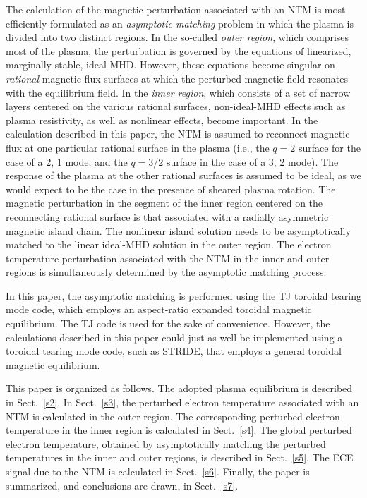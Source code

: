 \documentclass[12pt,prb,aps]{revtex4-1}
\begin{document}
The calculation of the  magnetic perturbation associated with an NTM is most efficiently formulated as an {\em asymptotic matching}\/ problem in which the  plasma is  divided into two distinct regions.\cite{tear1,tear2,tear3,tear4,tear5,tear6,tear7,tear8,tear9,tear10}    In the so-called {\em outer region}, which comprises most
of the plasma, the perturbation is governed by the equations of linearized, marginally-stable, ideal-MHD.
However, these equations become singular on   {\em rational}\/ magnetic flux-surfaces at which the perturbed magnetic field resonates with the equilibrium field. In the {\em inner region}, which
consists of a set of narrow layers centered on the various rational surfaces, non-ideal-MHD effects such as plasma resistivity, as well as nonlinear effects,  become important. 
 In the calculation described in this paper, the NTM is assumed to reconnect magnetic flux at one particular rational surface in the plasma (i.e., the
 $q=2$ surface for the case of a 2, 1 mode, and the $q=3/2$ surface in the case of a 3, 2 mode). The response of the plasma at the
 other rational surfaces is assumed to be ideal, as we would expect to be the case in the presence of sheared plasma rotation.\cite{tear5}
The magnetic perturbation in the segment of the inner region centered on the reconnecting rational surface is that associated with a radially asymmetric magnetic island chain.\cite{ntm1,island}
The nonlinear island solution needs to be asymptotically matched to the linear ideal-MHD solution in the outer region. The
electron temperature perturbation associated with the NTM in the inner and outer regions is simultaneously  determined by the asymptotic matching process. 

In this paper, the asymptotic matching is performed using the TJ toroidal tearing mode code,\cite{tear9,tear10}  which employs an aspect-ratio
expanded toroidal magnetic equilibrium.\cite{exp} The TJ code is used for the sake of convenience. However, the calculations described in this paper
could just as well be implemented using a toroidal tearing mode code, such as STRIDE,\cite{tear7,tear8} that employs a general toroidal magnetic 
equilibrium. 

This paper is organized as follows. The adopted plasma equilibrium is described in Sect.~\ref{s2}.  In Sect.~\ref{s3}, the perturbed electron temperature associated with  an NTM is calculated in the outer region. The corresponding perturbed electron temperature  in the inner region is calculated in Sect.~\ref{s4}. The
global perturbed electron temperature, obtained by asymptotically matching the perturbed temperatures  in  the inner and outer regions, is
described in Sect.~\ref{s5}. 
The ECE signal due to the NTM is calculated in Sect.~\ref{s6}.
 Finally, the paper is summarized, and conclusions are drawn, in Sect.~\ref{s7}. 
\end{document}
